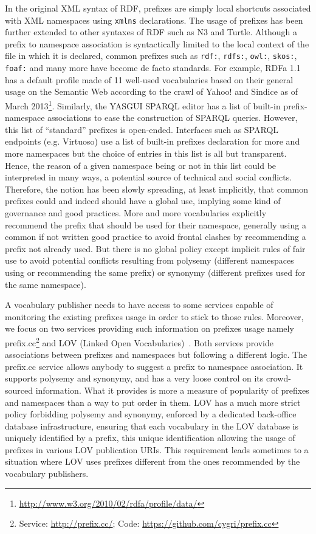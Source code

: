In the original XML syntax of RDF, prefixes are simply local shortcuts associated with XML namespaces using \texttt{xmlns} declarations. The usage of prefixes has been further extended to other syntaxes of RDF such as N3 and Turtle. Although a prefix to namespace association is syntactically limited to the local context of the file in which it is declared, common prefixes such as \texttt{rdf:}, \texttt{rdfs:}, \texttt{owl:}, \texttt{skos:}, \texttt{foaf:} and many more have become de facto standards. For example, RDFa 1.1 has a default profile made of 11 well-used vocabularies based on their general usage on the Semantic Web according to the crawl of Yahoo! and Sindice as of March 2013\footnote{\url{http://www.w3.org/2010/02/rdfa/profile/data/}}. Similarly, the YASGUI SPARQL editor has a list of built-in prefix-namespace associations to ease the construction of SPARQL queries. However, this list of ``standard'' prefixes is open-ended. Interfaces such as SPARQL endpoints (e.g. Virtuoso) use a list of built-in prefixes declaration for more and more namespaces but the choice of entries in this list is all but transparent. Hence, the reason of a given namespace being or not in this list could be interpreted in many ways, a potential source of technical and social conflicts. Therefore, the notion has been slowly spreading, at least implicitly, that common prefixes could and indeed should have a global use, implying some kind of governance and good practices. More and more vocabularies explicitly recommend the prefix that should be used for their namespace, generally using a common if not written good practice to avoid frontal clashes by recommending a prefix not already used. But there is no global policy except implicit rules of fair use to avoid potential conflicts resulting from polysemy (different namespaces using or recommending the same prefix) or synonymy (different prefixes used for the same namespace).

A vocabulary publisher needs to have access to some services capable of monitoring the existing prefixes usage in order to stick to those rules. Moreover, we focus on two services providing such information on prefixes usage namely prefix.cc\footnote{Service: \url{http://prefix.cc/}; Code: \url{https://github.com/cygri/prefix.cc}} and LOV (Linked Open Vocabularies)~\cite{Datalift:D22}. Both services provide associations between prefixes and namespaces but following a different logic. The prefix.cc service allows anybody to suggest a prefix to namespace association. It supports polysemy and synonymy, and has a very loose control on its crowd-sourced information. What it provides is more a measure of popularity of prefixes and namespaces than a way to put order in them. LOV has a much more strict policy forbidding polysemy and synonymy, enforced by a dedicated back-office database infrastructure, ensuring that each vocabulary in the LOV database is uniquely identified by a prefix, this unique identification allowing the usage of prefixes in various LOV publication URIs. This requirement leads sometimes to a situation where LOV uses prefixes different from the ones recommended by the vocabulary publishers.

